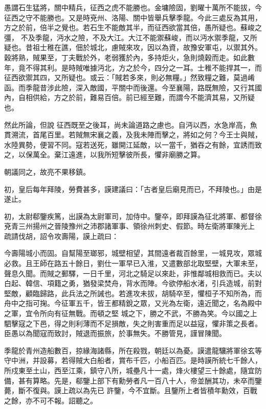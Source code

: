 \begin{pinyinscope}
 愚謂石生猛將，關中精兵，征西之虎不能勝也。金墉險固，劉曜十萬所不能拔，今征西之守不能勝也。又是時兗州、洛陽、關中皆舉兵擊季龍。今此三處反為其用，方之於前，倍半之覺也。若石生不能敵其半，而征西欲當其倍，愚所疑也。蘇峻之彊，
 不及季龍，沔水之險，不及大江。大江不能禦蘇峻，而以沔水禦季龍，又所疑也。昔祖士稚在譙，佃於城北，慮賊來攻，因以為資，故豫安軍屯，以禦其外。穀將熟，賊果至，丁夫戰於外，老弱獲於內，多持炬火，急則燒穀而走。如此數年，竟不得其利。是時賊唯據沔北，方之於今，四分之一耳。士稚不能捍其一，而征西欲禦其四，又所疑也。或云：「賊若多來，則必無糧。」然致糧之難，莫過崤函。而季龍昔涉此險，深入敵國，平關中而後還。今至襄陽，路既無險，又行其國內，自相供給，方之於前，難易百倍。前已經至難，而謂今不能濟其易，又所疑也。



 然此所論，但說
 征西既至之後耳，尚未論道路之慮也。自沔以西，水急岸高，魚貫溯流，首尾百里。若賊無宋襄之義，及我未陣而擊之，將如之何？今王士與賊，水陸異勢，便習不同。寇若送死，雖開江延敵，以一當千，猶吞之有餘，宜誘而致之，以保萬全。棄江遠進，以我所短擊彼所長，懼非廟勝之算。



 朝議同之，故亮不果移鎮。



 初，皇后每年拜陵，勞費甚多，謨建議曰：「古者皇后廟見而已，不拜陵也。」由是遂止。



 初，太尉郗鑒疾篤，出謨為太尉軍司，加侍中。鑒卒，即拜謨為征北將軍、都督徐兗青三州揚州之晉陵豫州之沛郡諸軍事、領徐州刺史、假節。時左衛將軍陳光上
 疏請伐胡，詔令攻壽陽，謨上疏曰：



 今壽陽城小而固。自幫陽至瑯邪，城壁相望，其間遠者裁百餘里，一城見攻，眾城必救。且王師在路五十餘日，劉仕一軍早已入淮，又遣數部北取堅壁，大軍未至，聲息久聞。而賊之郵驛，一日千里，河北之騎足以來赴，非惟鄰城相救而已。夫以白起、韓信、項籍之勇，猶發梁焚舟，背水而陣。今欲停船水渚，引兵造城，前對堅敵，顧臨歸路，此兵法之所誡也。若進攻未拔，胡騎卒至，懼桓子不知所為，而舟中之指可掬。今征軍五千，皆王都精銳之眾，又光為左衛，遠近聞之，名為殿中之軍，宜令所向有征無戰。而頓之堅
 城之下，勝之不武，不勝為笑。今以國之上駟擊寇之下邑，得之則利薄而不足損敵，失之則害重而足以益寇，懼非策之長者。臣愚以為聞寇而致討，賊退而振旅，於事無失。不勝管見，謹冒陳聞。



 季龍於青州造船數百，掠緣海諸縣，所在殺戮，朝廷以為憂。謨遣龍驤將軍徐玄等守中洲，并設募，若得賊大白船者，賞布千匹，小船百匹。是時謨所統七千餘人，所戍東至土山，西至江乘，鎮守八所，城壘凡十一處，烽火樓望三十餘處，隨宜防備，甚有算略。先是，郗鑒上部下有勳勞者凡一百八十人，帝並酬其功，未卒而鑒薨，斷不復與。謨上疏以為先已
 許鑒，今不宜斷。且鑒所上者皆積年勳效，百戰之餘，亦不可不報。詔聽之。




\end{pinyinscope}
